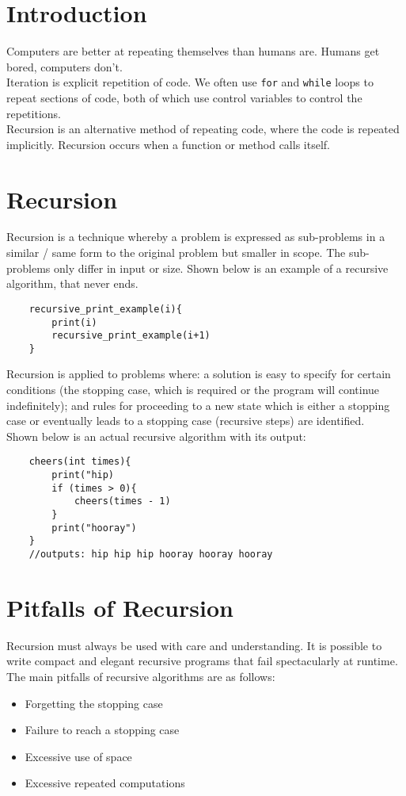 
\section{Introduction}
Computers are better at repeating themselves than humans are. Humans get bored, computers don't.\\

Iteration is explicit repetition of code. We often use \verb|for| and \verb|while| loops to repeat sections of code, both of which use control variables to control the repetitions.\\

Recursion is an alternative method of repeating code, where the code is repeated implicitly. Recursion occurs when a function or method calls itself.

\section{Recursion}
Recursion is a technique whereby a problem is expressed as sub-problems in a similar / same form to the original problem but smaller in scope. The sub-problems only differ in input or size. Shown below is an example of a recursive algorithm, that never ends.
\begin{verbatim}
    recursive_print_example(i){
        print(i)
        recursive_print_example(i+1)
    }
\end{verbatim}
Recursion is applied to problems where: a solution is easy to specify for certain conditions (the stopping case, which is required or the program will continue indefinitely); and rules for proceeding to a new state which is either a stopping case or eventually leads to a stopping case (recursive steps) are identified.\\

Shown below is an actual recursive algorithm with its output:
\begin{verbatim}
    cheers(int times){
        print("hip)
        if (times > 0){
            cheers(times - 1)
        }
        print("hooray")
    }
    //outputs: hip hip hip hooray hooray hooray
\end{verbatim}

\section{Pitfalls of Recursion}
Recursion must always be used with care and understanding. It is possible to write compact and elegant recursive programs that fail spectacularly at runtime. The main pitfalls of recursive algorithms are as follows:
\begin{itemize}
    \item Forgetting the stopping case
    \item Failure to reach a stopping case
    \item Excessive use of space
    \item Excessive repeated computations
\end{itemize}

